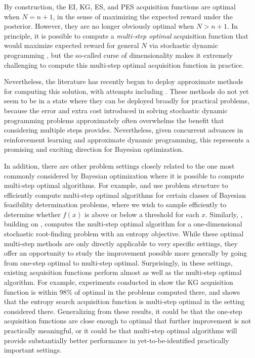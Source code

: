\documentclass{article}
\begin{document}
By construction, the EI, KG, ES, and PES acquisition functions are optimal when $N=n+1$, in the sense of maximizing the expected reward under the posterior.  However, they are no longer obviously optimal when $N>n+1$.  In principle, it is possible to compute a {\it multi-step optimal} acquisition function that would maximize expected reward for general $N$ via stochastic dynamic programming \citep{DyYu79}, but the so-called curse of dimensionality \citep{Po07} makes it extremely challenging to compute this multi-step optimal acquisition function in practice.  

Nevertheless, the literature has recently begun to deploy approximate methods for computing this solution, with attempts including \cite{lam2016bayesian,GinsbourgerRiche2010,gonzalez2016glasses}.  These methods do not yet seem to be in a state where they can be deployed broadly for practical problems, because the error and extra cost introduced in solving stochastic dynamic programming problems approximately often overwhelms the benefit that considering multiple steps provides. Nevertheless, given concurrent advances in reinforcement learning and approximate dynamic programming, this represents a promising and exciting direction for Bayesian optimization.

In addition, there are other problem settings closely related to the one most commonly considered by Bayesian optimization where it is possible to compute multi-step optimal algorithms.  For example, \cite{cashore2016multi} and \cite{xie2013sequential} use problem structure to efficiently compute multi-step optimal algorithms for certain classes of Bayesian feasibility determination problems, where we wish to sample efficiently to determine whether $f(x)$ is above or below a threshold for each $x$.  Similarly, \cite{waeber2013bisection}, building on \cite{jedynak2012twenty}, computes the multi-step optimal algorithm for a one-dimensional stochastic root-finding problem with an entropy objective.
While these optimal multi-step methods are only directly applicable to very specific settings, 
they offer an opportunity to study the improvement possible more generally by going from one-step optimal to multi-step optimal.
Surprisingly, in these settings, existing acquisition functions perform almost as well as the multi-step optimal algorithm.   For example, experiments conducted in \cite{cashore2016multi} show the KG acquisition function is within 98\% of optimal in the problems computed there, and \cite{waeber2013bisection} shows that the entropy search acquisition function is multi-step optimal in the setting considered there.  Generalizing from these results, it could be that the one-step acquisition functions are close enough to optimal that further improvement is not practically meaningful, or it could be that multi-step optimal algorithms will provide substantially better performance in yet-to-be-identified practically important settings.
\end{document}
